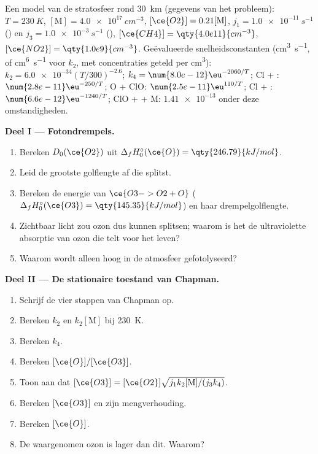 \begin{problem}
\label{pb:b3:photochemistry:1}
Een model van de stratosfeer rond \qty{30}{km} (gegevens van het probleem): $T = \qty{230}{K}$, $[\mathrm M] =
\qty{4.0e17}{cm^{-3}}$, $[\ce{O2}] = 0.21[\mathrm M]$,  $j_1 = \qty{1.0e-11}{s^{-1}}$ ()
en $j_3 = \qty{1.0e-3}{s^{-1}}$ (), $[\ce{CH4}] = \qty{4.0e11}{cm^{-3}}$, $[\ce{NO2}] = \qty{1.0e9}{cm^{-3}}$. Geëvalueerde
snelheidsconstanten (\unit{cm^3.s^{-1}}, of \unit{cm^6.s^{-1}} voor $k_2$,
met concentraties geteld per \unit{cm^3}):
$k_2 = \num{6.0e-34}(T/300)^{-2.6}$; $k_4 = \num{8.0e-12}\eu^{-2060/T}$; Cl + : $\num{2.8e-11}\eu^{-250/T}$;
O + ClO: $\num{2.5e-11}\eu^{110/T}$; Cl + : $\num{6.6e-12}\eu^{-1240/T}$; ClO +  + M: $\num{1.41e-13}$ onder
deze omstandigheden.

\medskip\noindent\textbf{Deel I --- Fotondrempels.}
\begin{enumerate}
  \item Bereken $D_0(\ce{O2})$ uit $\Delta_fH^\circ_0(\ce{O}) = \qty{246.79}{kJ/mol}$.
  \item Leid de grootste golflengte af die  splitst.
  \item Bereken de energie van $\ce{O3 -> O2 + O}$ ($\Delta_fH^\circ_0(\ce{O3}) = \qty{145.35}{kJ/mol}$) en
        haar drempelgolflengte.
  \item Zichtbaar licht zou ozon dus kunnen splitsen; waarom is het de
        ultraviolette absorptie van ozon die telt voor het leven?
  \item Waarom wordt  alleen hoog in de atmosfeer gefotolyseerd?
\end{enumerate}

\medskip\noindent\textbf{Deel II --- De stationaire toestand van Chapman.}
\begin{enumerate}[resume]
  \item Schrijf de vier stappen van Chapman op.
  \item Bereken $k_2$ en $k_2[\mathrm M]$ bij \qty{230}{K}.
  \item Bereken $k_4$.
  \item Bereken $[\ce{O}]/[\ce{O3}]$.
  \item Toon aan dat $[\ce{O3}] = [\ce{O2}]\sqrt{j_1k_2[\mathrm M]/(j_3k_4)}$.
  \item Bereken $[\ce{O3}]$ en zijn mengverhouding.
  \item Bereken $[\ce{O}]$.
  \item De waargenomen ozon is lager dan dit. Waarom?
\end{enumerate}


\end{problem}
